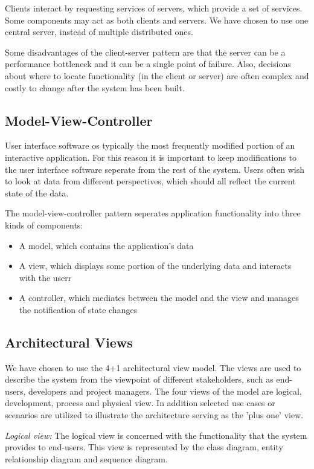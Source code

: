 \documentclass{report}
\begin{document}
Clients interact by requesting services of servers, which provide a set of services. Some components may act as both clients and servers. We have chosen to use one central server, instead of multiple distributed ones.

Some disadvantages of the client-server pattern are that the server can be a performance bottleneck and it can be a single point of failure. Also, decisions about where to locate functionality (in the client or server) are often complex and costly to change after the system has been built. \cite[p. 217]{book:bass}

\subsection{Model-View-Controller}
User interface software os typically the most frequently modified portion of an interactive application. For this reason it is important to keep modifications to the user interface software seperate from the rest of the system. Users often wish to look at data from different perspectives, which should all reflect the current state of the data.  \cite[p. 212]{book:bass}

The model-view-controller pattern seperates application functionality into three kinds of components:

\begin{itemize}
    \item A model, which contains the application's data
    \item A view, which displays some portion of the underlying data and interacts with the userr
    \item A controller, which mediates between the model and the view and manages the notification of state changes 
\end{itemize}


\subsection{Architectural Views} \label{sec:architectural_views}
We have chosen to use the 4+1 architectural view model. The views are used to describe the system from the viewpoint of different stakeholders, such as end-users, developers and project managers. The four views of the model are logical, development, process and physical view. In addition selected use cases or scenarios are utilized to illustrate the architecture serving as the 'plus one' view. \cite{website:kruchten}


\emph{Logical view:} The logical view is concerned with the functionality that the system provides to end-users. This view is represented by the class diagram, entity relationship diagram and sequence diagram.
\end{document}
